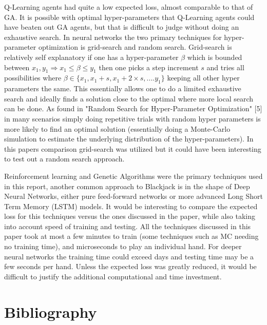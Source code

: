 \documentclass[10pt, a4paper, twocolumn]{article}
\begin{document}
Q-Learning agents had quite a low expected loss, almost comparable to that of GA. It is possible with optimal hyper-parameters that Q-Learning agents could have beaten out GA agents, but that is difficult to judge without doing an exhaustive search. In neural networks the two primary techniques for hyper-parameter optimization is grid-search and random search. Grid-search is relatively self explanatory if one has a hyper-parameter $\beta$ which is bounded between $x_1, y_1 \Rightarrow x_1 \leq \beta \leq y_1$ then one picks a step increment $s$ and tries all possibilities where $\beta \in \{x_1, x_1 + s, x_1 + 2 \times s, .... y_1\}$ keeping all other hyper parameters the same. This essentially allows one to do a limited exhaustive search and ideally finds a solution close to the optimal where more local search can be done. As found in "Random Search for Hyper-Parameter Optimization" [5] in many scenarios simply doing repetitive trials with random hyper parameters is more likely to find an optimal solution (essentially doing a Monte-Carlo simulation to estimate the underlying distribution of the hyper-parameters). In this papers comparison grid-search was utilized but it could have been interesting to test out a random search approach.

Reinforcement learning and Genetic Algorithms were the primary techniques used in this report, another common approach to Blackjack is in the shape of Deep Neural Networks, either pure feed-forward networks or more advanced Long Short Term Memory (LSTM) models. It would be interesting to compare the expected loss for this techniques versus the ones discussed in the paper, while also taking into account speed of training and testing. All the techniques discussed in this paper took at most a few minutes to train (some techniques such as MC needing no training time), and microseconds to play an individual hand. For deeper neural networks the training time could exceed days and testing time may be a few seconds per hand. Unless the expected loss was greatly reduced, it would be difficult to justify the additional computational and time investment. 
\section{Bibliography}
\end{document}
